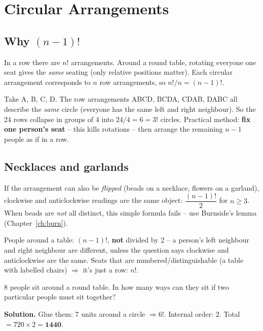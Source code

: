 \documentclass[11pt,a4paper,openany]{report}
\begin{document}
\chapter{Circular Arrangements}\label{ch:circ}

\section{Why $(n-1)!$}
In a row there are $n!$ arrangements. Around a round table, rotating everyone one seat gives the
\emph{same} seating (only relative positions matter). Each circular arrangement corresponds
to $n$ row arrangements, so $n!/n=(n-1)!$.

\begin{why}
Take A, B, C, D. The row arrangements ABCD, BCDA, CDAB, DABC all describe the \emph{same} circle
(everyone has the same left and right neighbour). So the 24 rows collapse in groups of 4 into
$24/4=6=3!$ circles. Practical method: \textbf{fix one person's seat} -- this kills rotations --
then arrange the remaining $n-1$ people as if in a row.
\end{why}

\section{Necklaces and garlands}
If the arrangement can also be \emph{flipped} (beads on a necklace, flowers on a garland), clockwise
and anticlockwise readings are the same object: $\dfrac{(n-1)!}{2}$ for $n\ge3$.
When beads are \emph{not} all distinct, this simple formula fails -- use Burnside's lemma (Chapter~\ref{ch:burn}).

\begin{trap}
People around a table: $(n-1)!$, \textbf{not} divided by 2 -- a person's left neighbour and right
neighbour are different, unless the question says clockwise and anticlockwise are the same.
Seats that are numbered/distinguishable (a table with labelled chairs) $\Rightarrow$ it's just a row: $n!$.
\end{trap}

\begin{example}
8 people sit around a round table. In how many ways can they sit if two particular people must sit together?

\textbf{Solution.} Glue them: 7 units around a circle $\Rightarrow6!$. Internal order: $2$.
Total $=720\times2=\mathbf{1440}$.
\end{example}
\end{document}
